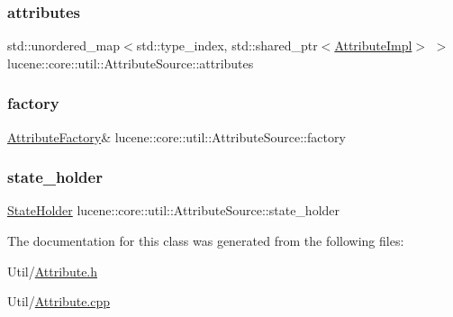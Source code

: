 \subsubsection{\texorpdfstring{attributes}{attributes}}
{\footnotesize\ttfamily std\+::unordered\+\_\+map$<$std\+::type\+\_\+index, std\+::shared\+\_\+ptr$<$\mbox{\hyperlink{classlucene_1_1core_1_1util_1_1AttributeImpl}{Attribute\+Impl}}$>$ $>$ lucene\+::core\+::util\+::\+Attribute\+Source\+::attributes\hspace{0.3cm}{\ttfamily [private]}}

\mbox{\label{classlucene_1_1core_1_1util_1_1AttributeSource_a1376420a752f337a0fdb582bdf160eba}} 
\subsubsection{\texorpdfstring{factory}{factory}}
{\footnotesize\ttfamily \mbox{\hyperlink{classlucene_1_1core_1_1util_1_1AttributeFactory}{Attribute\+Factory}}\& lucene\+::core\+::util\+::\+Attribute\+Source\+::factory\hspace{0.3cm}{\ttfamily [private]}}

\mbox{\label{classlucene_1_1core_1_1util_1_1AttributeSource_a62ac9cefce936c5e903da6f3d9c9f31c}} 
\subsubsection{\texorpdfstring{state\+\_\+holder}{state\_holder}}
{\footnotesize\ttfamily \mbox{\hyperlink{classlucene_1_1core_1_1util_1_1AttributeSource_1_1StateHolder}{State\+Holder}} lucene\+::core\+::util\+::\+Attribute\+Source\+::state\+\_\+holder\hspace{0.3cm}{\ttfamily [private]}}



The documentation for this class was generated from the following files\+:\begin{DoxyCompactItemize}
\item 
Util/\mbox{\hyperlink{Util_2Attribute_8h}{Attribute.\+h}}\item 
Util/\mbox{\hyperlink{Util_2Attribute_8cpp}{Attribute.\+cpp}}\end{DoxyCompactItemize}
